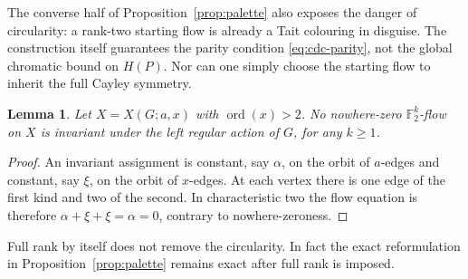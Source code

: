 \documentclass[11pt,a4paper]{article}
\newtheorem{lemma}[theorem]{Lemma}
\theoremstyle{definition}
\theoremstyle{remark}
\newcommand{\ord}{\operatorname{ord}}
\newcommand{\X}[3]{X(#1;#2,#3)}
\begin{document}
The converse half of Proposition~\ref{prop:palette} also exposes the danger of circularity: a rank-two starting flow is already a Tait colouring in disguise.  The construction itself guarantees the parity condition \eqref{eq:cdc-parity}, not the global chromatic bound on $H(P)$.  Nor can one simply choose the starting flow to inherit the full Cayley symmetry.

\begin{lemma}\label{lem:no-invariant-eight-flow}
Let $X=\X{G}{a}{x}$ with $\ord(x)>2$.  No nowhere-zero $\mathbb F_2^k$-flow on $X$ is invariant under the left regular action of $G$, for any $k\ge1$.
\end{lemma}
\begin{proof}
An invariant assignment is constant, say $\alpha$, on the orbit of $a$-edges and constant, say $\xi$, on the orbit of $x$-edges.  At each vertex there is one edge of the first kind and two of the second.  In characteristic two the flow equation is therefore $\alpha+\xi+\xi=\alpha=0$, contrary to nowhere-zeroness.
\end{proof}

Full rank by itself does not remove the circularity.  In fact the exact reformulation in Proposition~\ref{prop:palette} remains exact after full rank is imposed.
\end{document}
